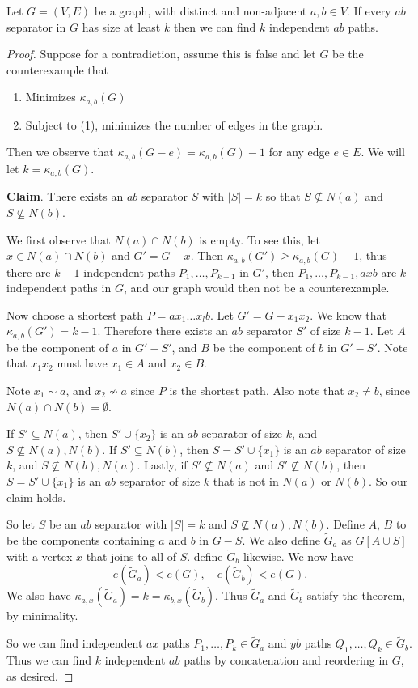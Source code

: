\documentclass[a4paper]{scrartcl}
\begin{document}
\begin{theorem}
	Let $G = (V, E)$ be a graph, with distinct and non-adjacent $a, b \in V$. If every $ab$ separator in $G$ has size at least $k$ then we can find $k$ independent $ab$ paths.
\end{theorem}
\begin{proof}
	Suppose for a contradiction, assume this is false and let $G$ be the counterexample that 
	\begin{enumerate}[label=(\arabic*)]
		\item Minimizes $\kappa_{a, b}(G)$
		\item Subject to (1), minimizes the number of edges in the graph.
	\end{enumerate}
	Then we observe that $\kappa_{a, b}(G - e) = \kappa_{a, b}(G) - 1$ for any edge $e \in E$. We will let $k = \kappa_{a, b}(G)$.

	\textbf{Claim}. There exists an $ab$ separator $S$ with $|S| = k$ so that $S \not \subseteq N(a)$ and $S \not \subseteq N(b)$.

	We first observe that $N(a) \cap N(b)$ is empty. To see this, let $x \in N(a) \cap N(b)$ and $G' = G-x$. Then $\kappa_{a, b}(G') \geq \kappa_{a, b}(G) - 1$, thus there are $k - 1$ independent paths $P_1, \dots, P_{k - 1}$ in $G'$, then $P_1, \dots, P_{k - 1}, axb$ are $k$ independent paths in $G$, and our graph would then not be a counterexample.

	Now choose a shortest path $P = a x_1 \dots x_l b$. Let $G' = G - x_1 x_2$. We know that $\kappa_{a, b}(G') = k - 1$. Therefore there exists an $ab$ separator $S'$ of size $k - 1$.
	Let $A$ be the component of $a$ in $G' - S'$, and $B$ be the component of $b$ in $G' - S'$. Note that $x_1x_2$ must have $x_1 \in A$ and $x_2 \in B$. 

	Note $x_1 \sim a$, and $x_2 \not \sim a$ since $P$ is the shortest path. Also note that $x_2 \neq b$, since $N(a) \cap N(b) = \emptyset$. 

	If $S' \subseteq N(a)$, then $S' \cup \{x_2\}$ is an $ab$ separator of size $k$, and $S \not \subseteq N(a), N(b)$. If $S' \subseteq N(b)$, then $S = S' \cup \{x_1\}$ is an $ab$ separator of size $k$, and $S \not \subseteq N(b), N(a)$. Lastly, if $S' \not \subseteq N(a)$ and $S' \not \subseteq N(b)$, then $S = S' \cup \{x_1\}$ is an $ab$ separator of size $k$ that is not in $N(a)$ or $N(b)$. So our claim holds.

	So let $S$ be an $ab$ separator with $|S| = k$ and $S \not \subseteq N(a), N(b)$. Define $A$, $B$ to be the components containing $a$ and $b$ in $G - S$. We also define $\tilde{G}_a$ as $G[A\cup S]$ with a vertex $x$ that joins to all of $S$. define $\tilde{G}_b$ likewise. We now have
	$$
	e(\tilde{G}_a) < e(G), \quad e(\tilde{G}_b) < e(G).
	$$
	We also have $\kappa_{a, x}(\tilde{G}_a) = k = \kappa_{b, x}(\tilde{G}_b)$. Thus $\tilde{G}_a$ and $\tilde{G}_b$ satisfy the theorem, by minimality. 

	So we can find independent $ax$ paths $P_1, \dots, P_k \in \tilde{G}_a$ and $yb$ paths $Q_1, \dots, Q_k \in \tilde{G}_b$. Thus we can find $k$ independent $ab$ paths by concatenation and reordering in $G$, as desired.
\end{proof}
\end{document}
